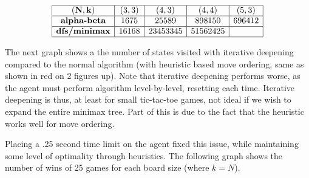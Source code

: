 \documentclass[12pt]{article}
\begin{document}
\[
\begin{array}{|c|c|c|c|c|}
    \hline\mathbf{(N,k)} & (3,3) & (4,3) & (4,4) & (5,3)\\
    \hline\textbf{alpha-beta}  & 1675& 25589& 898150&696412\\
    \hline\textbf{dfs/minimax} & 16168& 23453345& 51562425&\\
    \hline
\end{array}
\]

The next graph shows a the number of states visited with iterative deepening compared to the normal algorithm (with heuristic based move ordering, same as shown in red on 2 figures up). Note that iterative deepening performs worse, as the agent must perform algorithm level-by-level, resetting each time. Iterative deepening is thus, at least for small tic-tac-toe games, not ideal if we wish to expand the entire minimax tree. Part of this is due to the fact that the heuristic works well for move ordering.

\begin{center}
\end{center}

Placing a .25 second time limit on the agent fixed this issue, while maintaining some level of optimality through heuristics. The following graph shows the number of wins of 25 games for each board size (where \(k=N\)).
\end{document}
